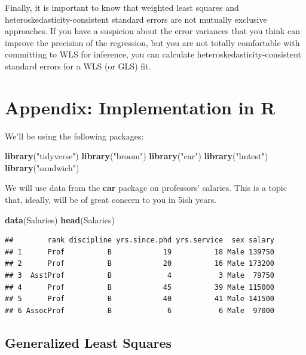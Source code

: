\documentclass[12pt,oneside,openany]{book}
\newenvironment{Shaded}{\begin{snugshade}}{\end{snugshade}}
\newcommand{\KeywordTok}[1]{\textcolor[rgb]{0.13,0.29,0.53}{\textbf{#1}}}
\newcommand{\StringTok}[1]{\textcolor[rgb]{0.31,0.60,0.02}{#1}}
\newcommand{\NormalTok}[1]{#1}
\begin{document}
Finally, it is important to know that weighted least squares and
heteroskedasticity-consistent standard errors are not mutually exclusive
approaches. If you have a suspicion about the error variances that you
think can improve the precision of the regression, but you are not
totally comfortable with committing to WLS for inference, you can
calculate heteroskedasticity-consistent standard errors for a WLS (or
GLS) fit.

\section{Appendix: Implementation in
R}\label{appendix-implementation-in-r}

We'll be using the following packages:

\begin{Shaded}
\begin{Highlighting}[]
\KeywordTok{library}\NormalTok{(}\StringTok{"tidyverse"}\NormalTok{)}
\KeywordTok{library}\NormalTok{(}\StringTok{"broom"}\NormalTok{)}
\KeywordTok{library}\NormalTok{(}\StringTok{"car"}\NormalTok{)}
\KeywordTok{library}\NormalTok{(}\StringTok{"lmtest"}\NormalTok{)}
\KeywordTok{library}\NormalTok{(}\StringTok{"sandwich"}\NormalTok{)}
\end{Highlighting}
\end{Shaded}

We will use data from the \textbf{car} package on professors' salaries.
This is a topic that, ideally, will be of great concern to you in 5ish
years.

\begin{Shaded}
\begin{Highlighting}[]
\KeywordTok{data}\NormalTok{(Salaries)}
\KeywordTok{head}\NormalTok{(Salaries)}
\end{Highlighting}
\end{Shaded}

\begin{verbatim}
##        rank discipline yrs.since.phd yrs.service  sex salary
## 1      Prof          B            19          18 Male 139750
## 2      Prof          B            20          16 Male 173200
## 3  AsstProf          B             4           3 Male  79750
## 4      Prof          B            45          39 Male 115000
## 5      Prof          B            40          41 Male 141500
## 6 AssocProf          B             6           6 Male  97000
\end{verbatim}

\subsection{Generalized Least
Squares}\label{generalized-least-squares-1}
\end{document}
